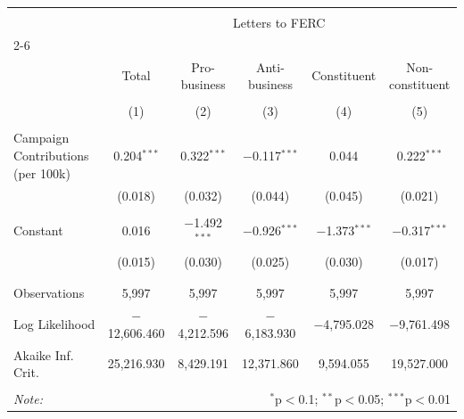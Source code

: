 
\begin{tabular}{@{\extracolsep{5pt}}lccccc} 
\\[-1.8ex]\hline 
\hline \\[-1.8ex] 
 & \multicolumn{5}{c}{Letters to FERC} \\ 
\cline{2-6} 
\\[-1.8ex] & Total & Pro-business & Anti-business & Constituent & Non-constituent \\ 
\\[-1.8ex] & (1) & (2) & (3) & (4) & (5)\\ 
\hline \\[-1.8ex] 
 Campaign Contributions (per 100k) & 0.204$^{***}$ & 0.322$^{***}$ & $-$0.117$^{***}$ & 0.044 & 0.222$^{***}$ \\ 
  & (0.018) & (0.032) & (0.044) & (0.045) & (0.021) \\ 
  & & & & & \\ 
 Constant & 0.016 & $-$1.492$^{***}$ & $-$0.926$^{***}$ & $-$1.373$^{***}$ & $-$0.317$^{***}$ \\ 
  & (0.015) & (0.030) & (0.025) & (0.030) & (0.017) \\ 
  & & & & & \\ 
\hline \\[-1.8ex] 
Observations & 5,997 & 5,997 & 5,997 & 5,997 & 5,997 \\ 
Log Likelihood & $-$12,606.460 & $-$4,212.596 & $-$6,183.930 & $-$4,795.028 & $-$9,761.498 \\ 
Akaike Inf. Crit. & 25,216.930 & 8,429.191 & 12,371.860 & 9,594.055 & 19,527.000 \\ 
\hline 
\hline \\[-1.8ex] 
\textit{Note:}  & \multicolumn{5}{r}{$^{*}$p$<$0.1; $^{**}$p$<$0.05; $^{***}$p$<$0.01} \\ 
\end{tabular} 
